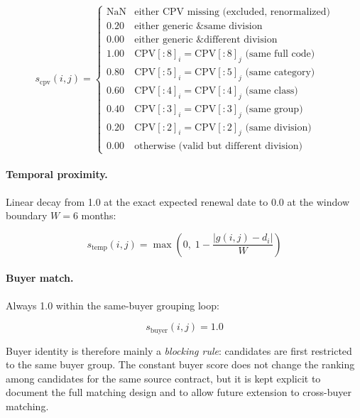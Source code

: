 \documentclass[12pt, a4paper]{article}
\begin{document}
\begin{equation}
  s_{\text{cpv}}(i,j) =
  \begin{cases}
    \text{NaN} & \text{either CPV missing (excluded, renormalized)} \\
    0.20 & \text{either generic \& same division} \\
    0.00 & \text{either generic \& different division} \\
    1.00 & \text{CPV}[:8]_i = \text{CPV}[:8]_j \text{ (same full code)} \\
    0.80 & \text{CPV}[:5]_i = \text{CPV}[:5]_j \text{ (same category)} \\
    0.60 & \text{CPV}[:4]_i = \text{CPV}[:4]_j \text{ (same class)} \\
    0.40 & \text{CPV}[:3]_i = \text{CPV}[:3]_j \text{ (same group)} \\
    0.20 & \text{CPV}[:2]_i = \text{CPV}[:2]_j \text{ (same division)} \\
    0.00 & \text{otherwise (valid but different division)}
  \end{cases}
\end{equation}

\paragraph{Temporal proximity.}
Linear decay from 1.0 at the exact expected renewal date to 0.0 at the
window boundary $W = 6$ months:

\begin{equation}
  s_{\text{temp}}(i,j) = \max\!\left(0,\; 1 - \frac{|g(i,j) - d_i|}{W}\right)
\end{equation}

\paragraph{Buyer match.}
Always 1.0 within the same-buyer grouping loop:

\begin{equation}
  s_{\text{buyer}}(i,j) = 1.0
\end{equation}

\noindent Buyer identity is therefore mainly a \emph{blocking rule}: candidates
are first restricted to the same buyer group. The constant buyer score does not
change the ranking among candidates for the same source contract, but it is kept
explicit to document the full matching design and to allow future extension to
cross-buyer matching.
\end{document}
